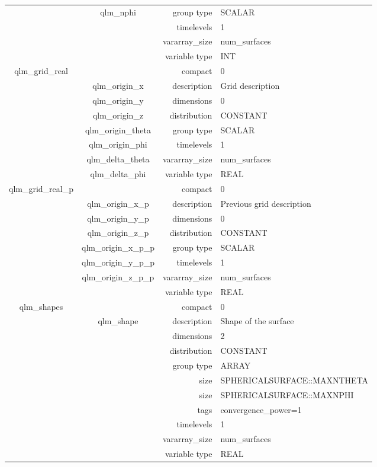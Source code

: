 \begin{tabular*}{150mm}{|c|c@{\extracolsep{\fill}}|rl|}
 & qlm\_nphi & group type & SCALAR \\ 
 &  & timelevels & 1 \\ 
 &  & vararray\_size & num\_surfaces \\ 
 &  & variable type & INT \\ 
\hline 
qlm\_grid\_real &  & compact & 0 \\ 
 & qlm\_origin\_x & description & Grid description \\ 
 & qlm\_origin\_y & dimensions & 0 \\ 
 & qlm\_origin\_z & distribution & CONSTANT \\ 
 & qlm\_origin\_theta & group type & SCALAR \\ 
 & qlm\_origin\_phi & timelevels & 1 \\ 
 & qlm\_delta\_theta & vararray\_size & num\_surfaces \\ 
 & qlm\_delta\_phi & variable type & REAL \\ 
\hline 
qlm\_grid\_real\_p &  & compact & 0 \\ 
 & qlm\_origin\_x\_p & description & Previous grid description \\ 
 & qlm\_origin\_y\_p & dimensions & 0 \\ 
 & qlm\_origin\_z\_p & distribution & CONSTANT \\ 
 & qlm\_origin\_x\_p\_p & group type & SCALAR \\ 
 & qlm\_origin\_y\_p\_p & timelevels & 1 \\ 
 & qlm\_origin\_z\_p\_p & vararray\_size & num\_surfaces \\ 
 &  & variable type & REAL \\ 
\hline 
qlm\_shapes &  & compact & 0 \\ 
 & qlm\_shape & description & Shape of the surface \\ 
 &  & dimensions & 2 \\ 
 &  & distribution & CONSTANT \\ 
 &  & group type & ARRAY \\ 
 &  & size & SPHERICALSURFACE::MAXNTHETA \\ 
& ~ & size & SPHERICALSURFACE::MAXNPHI \\ 
 &  & tags & convergence\_power=1 \\ 
 &  & timelevels & 1 \\ 
 &  & vararray\_size & num\_surfaces \\ 
 &  & variable type & REAL \\ 
\hline 
\end{tabular*} 



